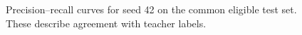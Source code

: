 \begin{figure}[t]
\caption{Precision--recall curves for seed 42 on the common eligible test set. These describe agreement with teacher labels.}
\label{fig:pr}
\end{figure}
